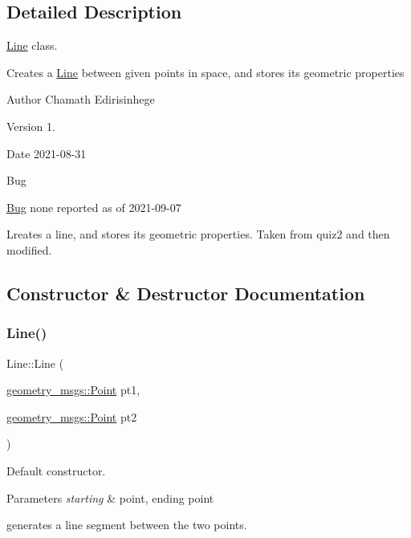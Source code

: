 \subsection{Detailed Description}
\hyperlink{classLine}{Line} class. 

Creates a \hyperlink{classLine}{Line} between given points in space, and stores its geometric properties \begin{DoxyAuthor}{Author}
Chamath Edirisinhege 
\end{DoxyAuthor}
\begin{DoxyVersion}{Version}
1. 
\end{DoxyVersion}
\begin{DoxyDate}{Date}
2021-\/08-\/31 
\end{DoxyDate}
\begin{DoxyRefDesc}{Bug}
\item[\hyperlink{bug__bug000004}{Bug}]none reported as of 2021-\/09-\/07 \end{DoxyRefDesc}


Lreates a line, and stores its geometric properties. Taken from quiz2 and then modified. 

\subsection{Constructor \& Destructor Documentation}
\mbox{\label{classLine_abad81a289f4a192ebdfdaae35dcd8a87}} 
\subsubsection{\texorpdfstring{Line()}{Line()}}
{\footnotesize\ttfamily Line\+::\+Line (\begin{DoxyParamCaption}\item[{\hyperlink{structgeometry__msgs_1_1Point}{geometry\+\_\+msgs\+::\+Point}}]{pt1,  }\item[{\hyperlink{structgeometry__msgs_1_1Point}{geometry\+\_\+msgs\+::\+Point}}]{pt2 }\end{DoxyParamCaption})}



Default constructor. 


\begin{DoxyParams}{Parameters}
{\em starting} & point, ending point\\
\hline
\end{DoxyParams}
generates a line segment between the two points. 

